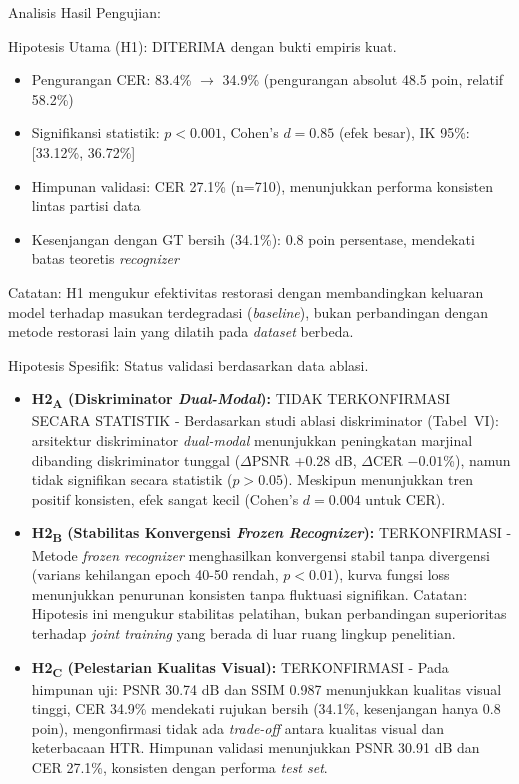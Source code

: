 \documentclass[journal]{IEEEtran}
\begin{document}
Analisis Hasil Pengujian:

Hipotesis Utama (H1): DITERIMA dengan bukti empiris kuat.
\begin{itemize}
\item Pengurangan CER: 83.4\% $\rightarrow$ 34.9\% (pengurangan absolut 48.5 poin, relatif 58.2\%)
\item Signifikansi statistik: $p<0.001$, Cohen's $d=0.85$ (efek besar), IK 95\%: [33.12\%, 36.72\%]
\item Himpunan validasi: CER 27.1\% (n=710), menunjukkan performa konsisten lintas partisi data
\item Kesenjangan dengan GT bersih (34.1\%): 0.8 poin persentase, mendekati batas teoretis \textit{recognizer}
\end{itemize}

Catatan: H1 mengukur efektivitas restorasi dengan membandingkan keluaran model terhadap masukan terdegradasi (\textit{baseline}), bukan perbandingan dengan metode restorasi lain yang dilatih pada \textit{dataset} berbeda.

Hipotesis Spesifik: Status validasi berdasarkan data ablasi.
\begin{itemize}
\item \textbf{H2\textsubscript{A} (Diskriminator \textit{Dual-Modal}):} TIDAK TERKONFIRMASI SECARA STATISTIK - Berdasarkan studi ablasi diskriminator (Tabel~VI): arsitektur diskriminator \textit{dual-modal} menunjukkan peningkatan marjinal dibanding diskriminator tunggal ($\Delta$PSNR +0.28 dB, $\Delta$CER $-0.01$\%), namun tidak signifikan secara statistik ($p>0.05$). Meskipun menunjukkan tren positif konsisten, efek sangat kecil (Cohen's $d=0.004$ untuk CER).

\item \textbf{H2\textsubscript{B} (Stabilitas Konvergensi \textit{Frozen Recognizer}):} TERKONFIRMASI - Metode \textit{frozen recognizer} menghasilkan konvergensi stabil tanpa divergensi (varians kehilangan epoch 40-50 rendah, $p<0.01$), kurva fungsi loss menunjukkan penurunan konsisten tanpa fluktuasi signifikan. Catatan: Hipotesis ini mengukur stabilitas pelatihan, bukan perbandingan superioritas terhadap \textit{joint training} yang berada di luar ruang lingkup penelitian.

\item \textbf{H2\textsubscript{C} (Pelestarian Kualitas Visual):} TERKONFIRMASI - Pada himpunan uji: PSNR 30.74 dB dan SSIM 0.987 menunjukkan kualitas visual tinggi, CER 34.9\% mendekati rujukan bersih (34.1\%, kesenjangan hanya 0.8 poin), mengonfirmasi tidak ada \textit{trade-off} antara kualitas visual dan keterbacaan HTR. Himpunan validasi menunjukkan PSNR 30.91 dB dan CER 27.1\%, konsisten dengan performa \textit{test set}.
\end{itemize}
\end{document}
